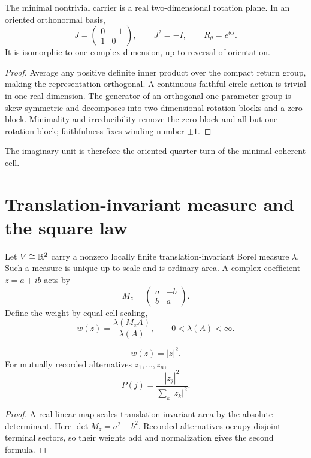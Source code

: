 \documentclass[11pt,a4paper]{article}
\begin{document}
\begin{theorem}
The minimal nontrivial carrier is a real two-dimensional rotation plane. In an oriented orthonormal basis,
\begin{equation}
J=\begin{pmatrix}0&-1\\1&0\end{pmatrix},\qquad J^2=-I,\qquad R_\theta=e^{\theta J}.
\end{equation}
It is isomorphic to one complex dimension, up to reversal of orientation.
\end{theorem}
\begin{proof}
Average any positive definite inner product over the compact return group, making the representation orthogonal. A continuous faithful circle action is trivial in one real dimension. The generator of an orthogonal one-parameter group is skew-symmetric and decomposes into two-dimensional rotation blocks and a zero block. Minimality and irreducibility remove the zero block and all but one rotation block; faithfulness fixes winding number $\pm1$.
\end{proof}
The imaginary unit is therefore the oriented quarter-turn of the minimal coherent cell.

\section{Translation-invariant measure and the square law}
Let $V\cong\mathbb{R}^2$ carry a nonzero locally finite translation-invariant Borel measure $\lambda$. Such a measure is unique up to scale and is ordinary area. A complex coefficient $z=a+ib$ acts by
\begin{equation}
M_z=\begin{pmatrix}a&-b\\b&a\end{pmatrix}.
\end{equation}
Define the weight by equal-cell scaling,
\begin{equation}
w(z)=\frac{\lambda(M_zA)}{\lambda(A)},\qquad0<\lambda(A)<\infty.
\end{equation}

\begin{theorem}
\begin{equation}
\boxed{w(z)=|z|^2.}
\end{equation}
For mutually recorded alternatives $z_1,\ldots,z_n$,
\begin{equation}
\boxed{P(j)=\frac{|z_j|^2}{\sum_k|z_k|^2}.}
\end{equation}
\end{theorem}
\begin{proof}
A real linear map scales translation-invariant area by the absolute determinant. Here $\det M_z=a^2+b^2$. Recorded alternatives occupy disjoint terminal sectors, so their weights add and normalization gives the second formula.
\end{proof}
\end{document}

